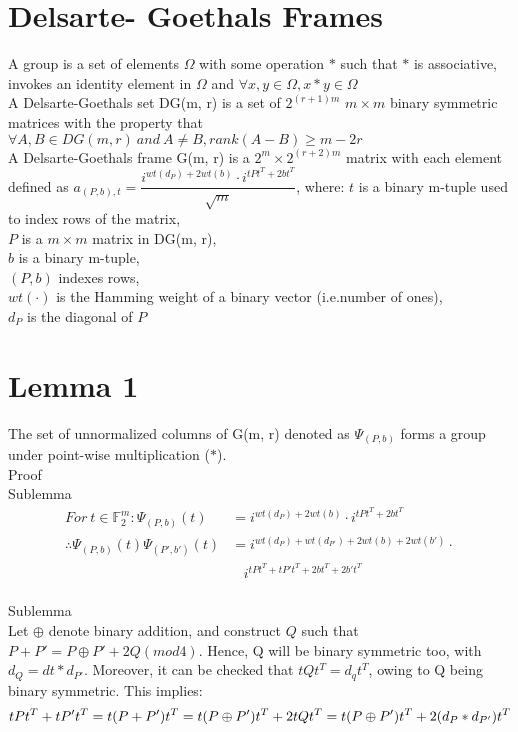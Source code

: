 \documentclass[12pt]{article}
\begin{document}
{\section{Delsarte-
Goethals Frames}
A group is a set of elements $\Omega$ with some operation $*$ such that $*$ is associative, invokes an identity element in $\Omega$ and $\forall x, y \in \Omega, x*y \in \Omega$\\
A Delsarte-Goethals set DG(m, r) is a set of $2^{(r+1)m}$ $m \times m$ binary symmetric matrices with the property that $\forall A, B \in DG(m, r)\ and\ A \neq B, rank(A - B) \geq m - 2r$\\
A Delsarte-Goethals frame G(m, r) is a $2^m \times 2^{(r+2)m}$ matrix with each element defined as $a_{(P, b), t} = \dfrac{i^{wt(d_P) + 2wt(b)}\cdot i^{tPt^T + 2bt^T}}{\sqrt{m}}$, where:
$t$ is a binary m-tuple used to index rows of the matrix,\\
$P$ is a $m \times m$ matrix in DG(m, r),\\
$b$ is a binary m-tuple,\\
$(P, b)$ indexes rows,\\
$wt(\cdot)$ is the Hamming weight of a binary vector (i.e.number of ones),\\
$d_P$ is the diagonal of $P$\\

\section{Lemma 1}
The set of unnormalized columns of G(m, r) denoted as $\Psi_{(P, b)}$ forms a group under point-wise multiplication ($*$).\\
Proof\\
Sublemma\\
\begin{align*}
    For\ t \in  \mathbb{F}_2^m: \Psi_{(P, b)}(t) &= i^{wt(d_P) + 2wt(b)}\cdot i^{tPt^T + 2bt^T}\\
    \therefore \Psi_{(P, b)}(t)\Psi_{(P', b')}(t) &= i^{wt(d_P) + wt(d_{P'}) + 2wt(b) + 2wt(b')}\cdot\\
    & \ \ \ \ i^{tPt^T + tP't^T + 2bt^T + 2b't^T}\\
\end{align*}

Sublemma\\
Let $\oplus$ denote binary addition, and construct $Q$ such that $P + P' = P \oplus P' + 2Q (mod 4)$. Hence, Q will be binary symmetric too, with $d_Q = dt* d_{P'}$. Moreover, it can be checked that $tQt^T = d_qt^T$, owing to Q being binary symmetric. This implies: 
\[ tPt^T + tP't^T = t(P+P')t^T = t(P \oplus P')t^T + 2tQt^T\\ =t(P \oplus P')t^T + 2(d_P * d_{P'})t^T\]

}
\end{document}

